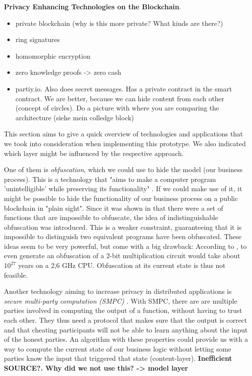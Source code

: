 \documentclass[runningheads]{llncs}
\begin{document}
\bigbreak
\textbf{Privacy Enhancing Technologies on the Blockchain}.
\begin{itemize}
    \item private blockchain (why is this more private? What kinds are there?)
    \item ring signatures
    \item homomorphic encryption
    \item zero knowledge proofs -> zero cash
    \item partiy.io. Also does secret messages. Has a private contract in the smart contract. We are better, because we can hide content from each other (concept of circles). Do a picture with where you are comparing the architecture (siehe mein colledge block)
\end{itemize}

This section aims to give a quick overview of technologies and applications that we took into consideration when implementing this prototype. We also indicated which layer might be influenced by the respective approach. 

One of them is \textit{obfuscation}, which we could use to hide the model (our business process). This is a technology that "aims to make a computer program 'unintelligible' while preserving its functionality" \cite{garg2016candidate}. If we could make use of it, it might be possible to hide the functionality of our business
process on a public blockchain in "plain sight". Since it was shown in \cite{barak2001possibility,barak2012possibility} that there were a set of functions that are impossible to obfuscate, the idea of indistinguishable obfuscation was
introduced. This is a weaker constraint, guaranteeing that it is impossible to distinguish two equivalent programs have
been obfuscated. These ideas seem to be very powerful, but come with a big drawback: According to \cite{banescu2015idea}, to even generate an obfuscation of a 2-bit multiplication circuit would take about $10^{27}$ years on a 2,6 GHz CPU. Obfuscation at its current state is thus not feasible. 

Another technology aiming to increase privacy in distributed applications is \textit{secure multi-party computation (SMPC)} \cite{orlandi2011multiparty}. With SMPC, there are are multiple parties involved in computing the output of a function, without having to trust each other. They thus need a protocol that makes sure that the output is correct and that cheating participants will not be able to learn anything about the input of the honest parties. An algorithm with these properties could provide us with a way to compute the current state of our business logic without letting some parties know the input that triggered that state (content-layer). \textbf{Inefficient \textbf{SOURCE?}. Why did we not use this? -> model layer}
\end{document}
